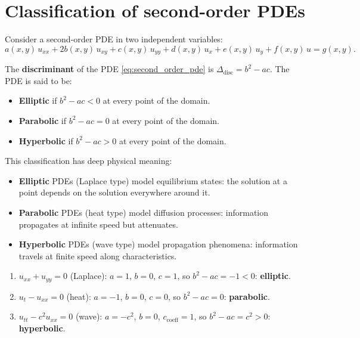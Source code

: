 \section{Classification of second-order PDEs}

Consider a second-order PDE in two independent variables:
\begin{equation}\label{eq:second_order_pde}
    a(x,y)\, u_{xx} + 2b(x,y)\, u_{xy} + c(x,y)\, u_{yy}
    + d(x,y)\, u_x + e(x,y)\, u_y + f(x,y)\, u = g(x,y).
\end{equation}

\begin{definition}
The \textbf{discriminant} of the PDE \eqref{eq:second_order_pde} is
$\Delta_{\mathrm{disc}} = b^2 - ac$. The PDE is said to be:
\begin{itemize}
    \item \textbf{Elliptic} if $b^2 - ac < 0$ at every point of the domain.
    \item \textbf{Parabolic} if $b^2 - ac = 0$ at every point of the domain.
    \item \textbf{Hyperbolic} if $b^2 - ac > 0$ at every point of the domain.
\end{itemize}
\end{definition}

\begin{intuition}
This classification has deep physical meaning:
\begin{itemize}
    \item \textbf{Elliptic} PDEs (Laplace type) model equilibrium states:
          the solution at a point depends on the solution everywhere around it.
    \item \textbf{Parabolic} PDEs (heat type) model diffusion processes:
          information propagates at infinite speed but attenuates.
    \item \textbf{Hyperbolic} PDEs (wave type) model propagation phenomena:
          information travels at finite speed along characteristics.
\end{itemize}
\end{intuition}

\begin{example}
\leavevmode
\begin{enumerate}
    \item $u_{xx} + u_{yy} = 0$ (Laplace): $a = 1$, $b = 0$, $c = 1$,
          so $b^2 - ac = -1 < 0$: \textbf{elliptic}.
    \item $u_t - u_{xx} = 0$ (heat): $a = -1$, $b = 0$, $c = 0$,
          so $b^2 - ac = 0$: \textbf{parabolic}.
    \item $u_{tt} - c^2 u_{xx} = 0$ (wave): $a = -c^2$, $b = 0$, $c_{\text{coeff}} = 1$,
          so $b^2 - ac = c^2 > 0$: \textbf{hyperbolic}.
\end{enumerate}
\end{example}

